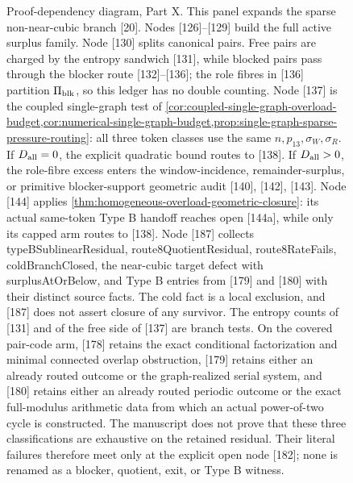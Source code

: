 \documentclass[11pt]{article}
\begin{document}
\begin{figure}[p]
\caption[Proof-dependency diagram, Part X]{Proof-dependency diagram, Part X.  This panel expands the sparse non-near-cubic branch [20].  Nodes [126]--[129] build the full active surplus family.  Node [130] splits canonical pairs.  Free pairs are charged by the entropy sandwich [131], while blocked pairs pass through the blocker route [132]--[136]; the role fibres in [136] partition \(\Pi_{\rm blk}\), so this ledger has no double counting.  Node [137] is the coupled single-graph test of \cref{cor:coupled-single-graph-overload-budget,cor:numerical-single-graph-budget,prop:single-graph-sparse-pressure-routing}: all three token classes use the same \(n,p_{13},\sigma_W,\sigma_R\).  If \(D_{\rm all}=0\), the explicit quadratic bound routes to [138].  If \(D_{\rm all}>0\), the role-fibre excess enters the window-incidence, remainder-surplus, or primitive blocker-support geometric audit [140], [142], [143].  Node [144] applies \cref{thm:homogeneous-overload-geometric-closure}: its actual same-token Type B handoff reaches open [144a], while only its capped arm routes to [138].  Node [187] collects typeBSublinearResidual, route8QuotientResidual, route8RateFails, coldBranchClosed, the near-cubic target defect with surplusAtOrBelow, and Type B entries from [179] and [180] with their distinct source facts.  The cold fact is a local exclusion, and [187] does not assert closure of any survivor.  The entropy counts of [131] and of the free side of [137] are branch tests.  On the covered pair-code arm, [178] retains the exact conditional factorization and minimal connected overlap obstruction, [179] retains either an already routed outcome or the graph-realized serial system, and [180] retains either an already routed periodic outcome or the exact full-modulus arithmetic data from which an actual power-of-two cycle is constructed.  The manuscript does not prove that these three classifications are exhaustive on the retained residual.  Their literal failures therefore meet only at the explicit open node [182]; none is renamed as a blocker, quotient, exit, or Type B witness.}
\label{fig:proof-diagram-part-x}
\end{figure}

\clearpage
\end{document}
